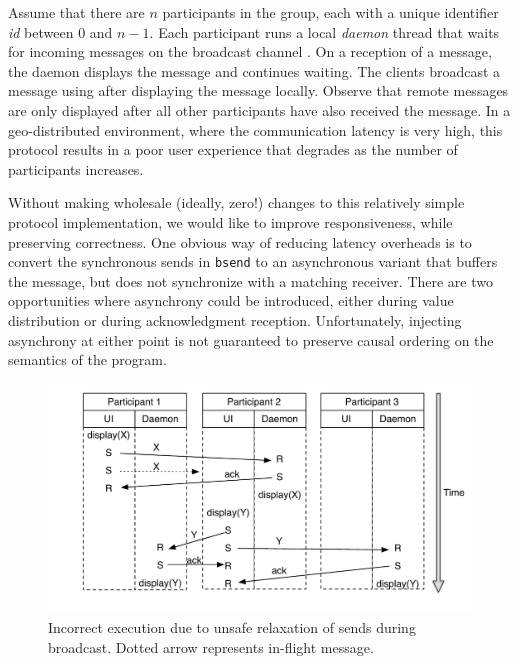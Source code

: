 Assume that there are $n$ participants in the group, each with a unique
identifier \emph{id} between $0$ and $n-1$. Each participant runs a local
\emph{daemon} thread that waits for incoming messages on the broadcast channel
. On a reception of a message, the daemon displays the message and
continues waiting. The clients broadcast a message using  after
displaying the message locally.  Observe that remote messages are only
displayed after all other participants have also received the message. In a
geo-distributed environment, where the communication latency is very high, this
protocol results in a poor user experience that degrades as the number of
participants increases.

Without making wholesale (ideally, zero!) changes to this relatively simple
protocol implementation, we would like to improve responsiveness, while
preserving correctness.  One obvious way of reducing latency overheads is to
convert the synchronous sends in {\tt bsend} to an asynchronous variant that
buffers the message, but does not synchronize with a matching receiver. There
are two opportunities where asynchrony could be introduced, either during value
distribution or during acknowledgment reception. Unfortunately, injecting
asynchrony at either point is not guaranteed to preserve causal ordering on the
semantics of the program.

\begin{figure}
\begin{centering}
	\includegraphics[width=\textwidth] {Figures/ChatServer_AsyncValue}
	\caption{Incorrect execution due to unsafe relaxation of sends during
	broadcast. Dotted arrow represents in-flight message.}
	\label{fig:CS_asend_value}
\end{centering}
\end{figure}


